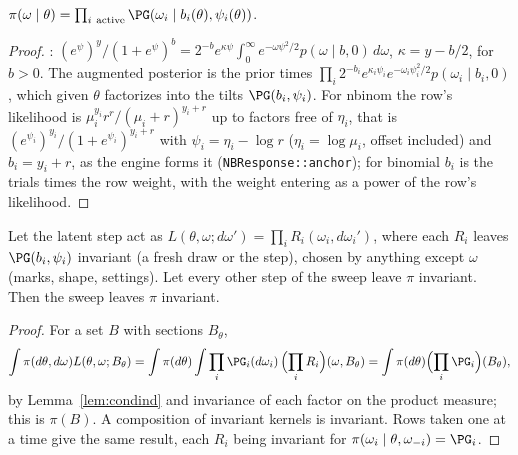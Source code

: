 \begin{lemma}\label{lem:condind}
$\pi(\omega\mid\theta)=\prod_{i\ \mathrm{active}}\PG(\omega_i\mid b_i(\theta),\psi_i(\theta))$.
\end{lemma}
\begin{proof}
\cite[Thm.~1]{psw}: $(e^{\psi})^{y}/(1+e^{\psi})^{b}=2^{-b}e^{\kappa\psi}\int_0^\infty e^{-\omega\psi^2/2}
p(\omega\mid b,0)\,d\omega$, $\kappa=y-b/2$, for $b>0$. The augmented posterior is the prior times $\prod_i
2^{-b_i}e^{\kappa_i\psi_i}e^{-\omega_i\psi_i^2/2}p(\omega_i\mid b_i,0)$, which given $\theta$ factorizes into the
tilts $\PG(b_i,\psi_i)$. For nbinom the row's likelihood is $\mu_i^{y_i}r^r/(\mu_i+r)^{y_i+r}$ up to factors
free of $\eta_i$, that is $(e^{\psi_i})^{y_i}/(1+e^{\psi_i})^{y_i+r}$ with $\psi_i=\eta_i-\log r$ ($\eta_i=\log
\mu_i$, offset included) and $b_i=y_i+r$, as the engine forms it (\texttt{NBResponse::anchor}); for binomial $b_i$
is the trials times the row weight, with the weight entering as a power of the row's likelihood.
\end{proof}

\begin{theorem}\label{thm:sweep}
Let the latent step act as $L(\theta,\omega;d\omega')=\prod_iR_i(\omega_i,d\omega_i')$, where each $R_i$ leaves
$\PG(b_i,\psi_i)$ invariant (a fresh draw or the step), chosen by anything except $\omega$ (marks, shape,
settings). Let every other step of the sweep leave $\pi$ invariant. Then the sweep leaves $\pi$ invariant.
\end{theorem}
\begin{proof}
For a set $B$ with sections $B_\theta$,
\[\int\pi(d\theta,d\omega)L(\theta,\omega;B_\theta)=\int\pi(d\theta)\int\prod_i\PG_i(d\omega_i)\,
\Bigl(\prod_iR_i\Bigr)(\omega,B_\theta)=\int\pi(d\theta)\Bigl(\prod_i\PG_i\Bigr)(B_\theta),\]
by
Lemma~\ref{lem:condind} and invariance of each factor on the product measure; this is $\pi(B)$. A composition
of invariant kernels is invariant. Rows taken one at a time give the same result, each $R_i$ being invariant for
$\pi(\omega_i\mid\theta,\omega_{-i})=\PG_i$.
\end{proof}

